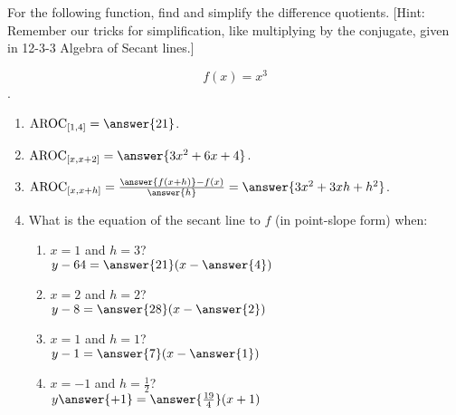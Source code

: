 \documentclass{ximera}
\author{Elizabeth Campolongo}
\begin{document}
\begin{exercise}

For the following function, 
find and simplify the difference quotients. [Hint: Remember our tricks for simplification, like multiplying by the conjugate, given in 12-3-3 Algebra of Secant lines.]

$$f(x)= x^3$$.

\begin{enumerate}
\item $\av_{[1,4]} = \answer{21}$.


\item $\av_{[x,x+2]} =  \answer{3x^2+6x+4}$.


\item $\av_{[x,x+h]} = \frac{\answer{f(x+h)}-f(x)}{\answer{h}} = \answer{3x^2+3xh+h^2}$.  


\item What is the equation of the secant line to $f$ (in point-slope form) when: 
\begin{enumerate}
\item  $x = 1$ and $h=3$?\\
$y-64= \answer{21}(x-\answer{4})$

\item $x = 2$ and $h=2$? \\
$y-8= \answer{28}(x-\answer{2})$

\item  $x = 1$ and $h=1$?\\
$y-1= \answer{7}(x-\answer{1})$

\item $x=-1$ and $h = \frac{1}{2}$? \\
$y\answer{+1}= \answer{\frac{19}{4}}(x+1)$
\end{enumerate}

\end{enumerate}
\end{exercise}
\end{document}
